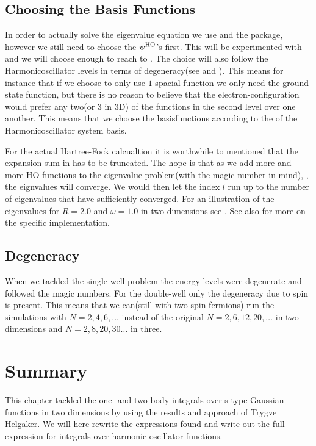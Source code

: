 \subsection{Choosing the Basis Functions}
    In order to actually solve the eigenvalue equation we use  and
    the  package, however we still need to choose the $\psi^{\text{HO}}$'s
    first. This will be experimented with and we will choose enough to reach to
    . The choice will also follow the
    Harmonicoscillator levels in terms of degeneracy(see  and
    ). This means for instance that if we choose to only use $1$
    spacial function we only need the ground-state function, but there is no
    reason to believe that the electron-configuration would prefer any two(or
    $3$ in 3D) of the functions in the second level over one another. This
    means that we choose the basisfunctions according to the  of the Harmonicoscillator system basis.

    For the actual Hartree-Fock calcualtion it is worthwhile to mentioned that
    the expansion sum in  has to be truncated. The hope
    is that as we add more and more HO-functions to the eigenvalue problem(with
    the magic-number in mind), , the eignvalues will converge.
    We would then let the index $l$ run up to the number of eigenvalues that
    have sufficiently converged.  For an illustration of the eigenvalues for
    $R=2.0$ and $\omega=1.0$ in two dimensions see . See also
     for more on the specific implementation.

\subsection{Degeneracy}
    When we tackled the single-well problem the energy-levels were degenerate
    and followed the magic numbers. For the double-well only the degeneracy due
    to spin is present. This means that we can(still with two-spin fermions)
    run the simulations with $N=2,4,6,\dots$ instead of the original
    $N=2,6,12,20,\dots$ in two dimensions and $N=2,8,20,30\dots$ in three.

\section{Summary\label{sec:basis_summary}}
    This chapter tackled the one- and two-body integrals over s-type Gaussian
    functions in two dimensions by using the results and approach of Trygve
    Helgaker. We will here rewrite the expressions found and write out the full
    expression for integrals over harmonic oscillator functions. \\


